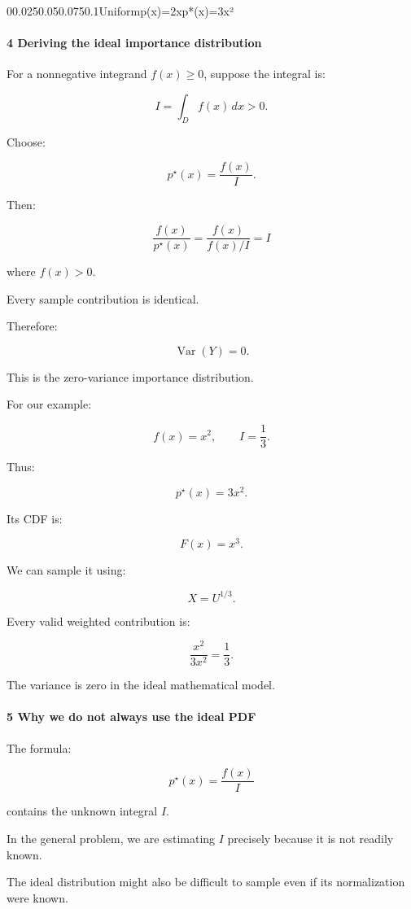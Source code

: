 00.0250.050.0750.1Uniformp(x)=2xp*(x)=3x²

\paragraph{4 Deriving the ideal importance distribution}\label{deriving-the-ideal-importance-distribution}

For a nonnegative integrand \(f(x)\ge0\), suppose the integral is:

\[
 I=\int_Df(x)\,dx>0.
\]

Choose:

\[
 \boxed{ p^\star(x)=\frac{f(x)}I }.
\]

Then:

\[
 \frac{f(x)}{p^\star(x)} = \frac{f(x)}{f(x)/I} =I
\]

where \(f(x)>0\).

Every sample contribution is identical.

Therefore:

\[
 \boxed{ \operatorname{Var}(Y)=0 }.
\]

This is the zero-variance importance distribution.

For our example:

\[
 f(x)=x^2, \qquad I=\frac13.
\]

Thus:

\[
 \boxed{ p^\star(x)=3x^2 }.
\]

Its CDF is:

\[
 F(x)=x^3.
\]

We can sample it using:

\[
 \boxed{ X=U^{1/3} }.
\]

Every valid weighted contribution is:

\[
 \frac{x^2}{3x^2}=\frac13.
\]

The variance is zero in the ideal mathematical model.

\paragraph{5 Why we do not always use the ideal PDF}\label{why-we-do-not-always-use-the-ideal-pdf}

The formula:

\[
 p^\star(x)=\frac{f(x)}I
\]

contains the unknown integral \(I\).

In the general problem, we are estimating \(I\) precisely because it is not readily known.

The ideal distribution might also be difficult to sample even if its normalization were known.

